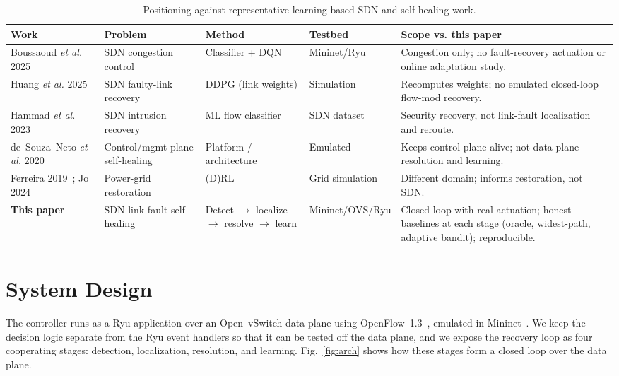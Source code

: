\documentclass[conference]{IEEEtran}
\begin{document}
\begin{table}[t]
\centering
\footnotesize
\caption{Positioning against representative learning-based SDN and self-healing work.}
\label{tab:related}
\begin{tabular}{@{}p{2.0cm}p{2.7cm}p{2.6cm}p{2.2cm}p{4.4cm}@{}}
\toprule
\textbf{Work} & \textbf{Problem} & \textbf{Method} & \textbf{Testbed} & \textbf{Scope vs. this paper} \\
\midrule
Boussaoud \emph{et al.} 2025~\cite{boussaoud2025} & SDN congestion control & Classifier + DQN & Mininet/Ryu & Congestion only; no fault-recovery actuation or online adaptation study. \\
Huang \emph{et al.} 2025~\cite{huang2025} & SDN faulty-link recovery & DDPG (link weights) & Simulation & Recomputes weights; no emulated closed-loop flow-mod recovery. \\
Hammad \emph{et al.} 2023~\cite{hammad2023} & SDN intrusion recovery & ML flow classifier & SDN dataset & Security recovery, not link-fault localization and reroute. \\
de~Souza~Neto \emph{et al.} 2020~\cite{neto2020} & Control/mgmt-plane self-healing & Platform / architecture & Emulated & Keeps control-plane alive; not data-plane resolution and learning. \\
Ferreira 2019~\cite{ferreira2019}; Jo 2024~\cite{jo2024} & Power-grid restoration & (D)RL & Grid simulation & Different domain; informs restoration, not SDN. \\
\textbf{This paper} & SDN link-fault self-healing & Detect $\rightarrow$ localize $\rightarrow$ resolve $\rightarrow$ learn & Mininet/OVS/Ryu & Closed loop with real actuation; honest baselines at each stage (oracle, widest-path, adaptive bandit); reproducible. \\
\bottomrule
\end{tabular}
\end{table}

\section{System Design}
\label{sec:design}
The controller runs as a Ryu application over an Open~vSwitch data plane using
OpenFlow~1.3~\cite{onf2012openflow,ryu}, emulated in Mininet~\cite{lantz2010mininet}.
We keep the decision logic separate from the Ryu event handlers so that it can be
tested off the data plane, and we expose the recovery loop as four cooperating
stages: detection, localization, resolution, and learning. Fig.~\ref{fig:arch} shows
how these stages form a closed loop over the data plane.
\end{document}
